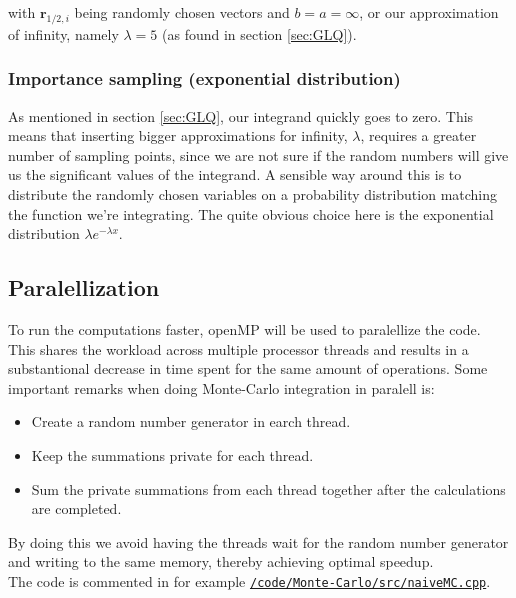 \documentclass[../main.tex]{subfiles}
\begin{document}
with $\mathbf r_{1/2,i}$ being randomly chosen vectors and $b=a=\infty$, or our approximation of infinity, namely $\lambda = 5$ (as found in section \ref{sec:GLQ}).

\subsubsection{Importance sampling (exponential distribution)} \label{sec:improvedMC}

As mentioned in section \ref{sec:GLQ}, our integrand quickly goes to zero. This means that inserting bigger approximations for infinity, $\lambda$, requires a greater number of sampling points, since we are not sure if the random numbers will give us the significant values of the integrand. A sensible way around this is to distribute the randomly chosen variables on a probability distribution matching the function we're integrating. The quite obvious choice here is the exponential distribution $\lambda e^{-\lambda x}$.

\subsection{Paralellization} \label{sec:theory-Paralellization}

To run the computations faster, openMP will be used to paralellize the code. This shares the workload across multiple processor threads and results in a substantional decrease in time spent for the same amount of operations. Some important remarks when doing Monte-Carlo integration in paralell is:
\begin{itemize}
 \item Create a random number generator in earch thread.
 \item Keep the summations private for each thread.
 \item Sum the private summations from each thread together after the calculations are completed.
\end{itemize}
By doing this we avoid having the threads wait for the random number generator and writing to the same memory, thereby achieving optimal speedup.
\\
The code is commented in for example \href{https://github.com/kmaasrud/Project-3/blob/master/code/Monte-Carlo/src/naiveMC.cpp}{\texttt{/code/Monte-Carlo/src/naiveMC.cpp}}.
\end{document}
